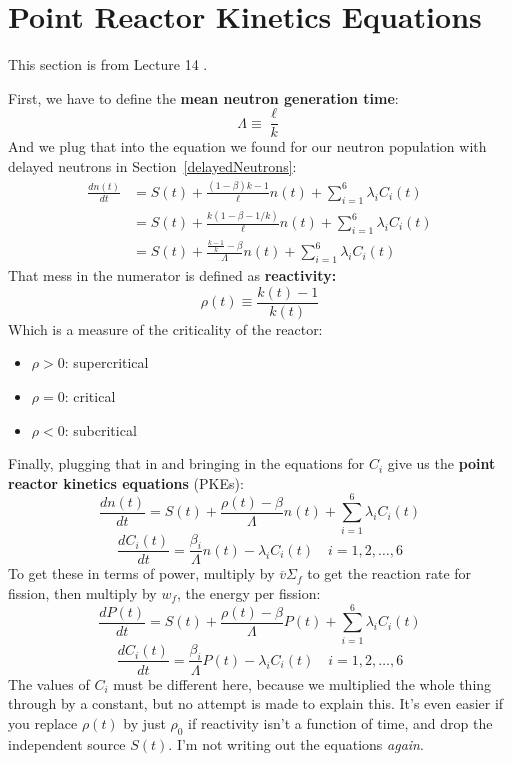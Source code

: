 \documentclass[letter]{article}
\begin{document}
\section{Point Reactor Kinetics Equations}

This section is from Lecture 14 \cite{lecture}.

\vspace{10pt}
First, we have to define the \textbf{mean neutron generation time}:
\begin{equation*}
  \Lambda \equiv \frac{\ell}{k}
\end{equation*}
And we plug that into the equation we found for our neutron population
with delayed neutrons in Section~\ref{delayedNeutrons}:
\begin{equation*}
  \begin{split}
    \frac{dn(t)}{dt}&= S(t) +
    \frac{(1-\beta)k-1}{\ell}n(t)+\sum^6_{i=1}\lambda_iC_i(t) \\
    &= S(t) +
    \frac{k(1-\beta{}-1/k)}{\ell}n(t)+\sum^6_{i=1}\lambda_iC_i(t) \\
    &= S(t) + \frac{\frac{k-1}{k}-\beta}{\Lambda}n(t)+\sum^6_{i=1}\lambda_iC_i(t)
  \end{split}
\end{equation*}
That mess in the numerator is defined as \textbf{reactivity:}
\begin{equation*}
  \rho(t) \equiv \frac{k(t)-1}{k(t)}
\end{equation*}
Which is a measure of the criticality of the reactor:
\begin{itemize}
\item[] $\rho > 0$: supercritical
\item[] $\rho = 0$: critical
\item[] $\rho < 0$: subcritical
\end{itemize}
Finally, plugging that in and bringing in the equations for $C_i$ give
us the \textbf{point reactor kinetics equations} (PKEs):
\begin{equation*}
      \frac{dn(t)}{dt}= S(t) + \frac{\rho(t)-\beta}{\Lambda}n(t)+\sum^6_{i=1}\lambda_iC_i(t)
\end{equation*}
\begin{equation*}
    \frac{dC_i(t)}{dt}=\frac{\beta_i}{\Lambda}n(t)-\lambda_iC_i(t)\quad i=1,2,\ldots,6
\end{equation*}
To get these in terms of power, multiply by $\overline{v}\Sigma_f$ to
get the reaction rate for fission, then multiply by $w_f$, the energy
per fission:
\begin{equation*}
      \frac{dP(t)}{dt}= S(t) + \frac{\rho(t)-\beta}{\Lambda}P(t)+\sum^6_{i=1}\lambda_iC_i(t)
\end{equation*}
\begin{equation*}
    \frac{dC_i(t)}{dt}=\frac{\beta_i}{\Lambda}P(t)-\lambda_iC_i(t)\quad i=1,2,\ldots,6
\end{equation*}
The values of $C_i$ must be different here, because we multiplied the
whole thing through by a constant, but no attempt is made to explain
this. It's even easier if you replace $\rho(t)$ by just $\rho_0$ if
reactivity isn't a function of time, and drop the independent source
$S(t)$. I'm not writing out the equations \textit{again}.
\end{document}
